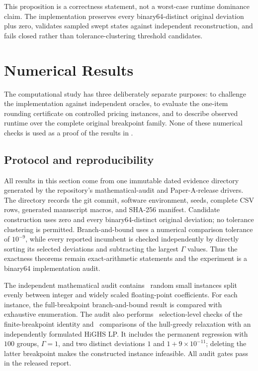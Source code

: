 \documentclass[11pt, a4paper]{article}
\theoremstyle{plain}
\theoremstyle{definition}
\theoremstyle{remark}
\begin{document}
This proposition is a correctness statement, not a worst-case runtime
dominance claim.  The implementation preserves every binary64-distinct
original deviation plus zero, validates sampled swept states against
independent reconstruction, and fails closed rather than tolerance-clustering
threshold candidates.


\section{Numerical Results}\label{sec:numerics}

The computational study has three deliberately separate purposes: to challenge
the implementation against independent oracles, to evaluate the one-item
rounding certificate on controlled pricing instances, and to describe observed
runtime over the complete original breakpoint family.  None of these numerical
checks is used as a proof of the results in
.

\subsection{Protocol and reproducibility}

All results in this section come from one immutable dated evidence directory
generated by the repository's mathematical-audit and Paper-A-release drivers.
The directory records the git
commit, software environment, seeds, complete CSV rows, generated manuscript
macros, and SHA-256 manifest.  Candidate construction uses zero and every
binary64-distinct original deviation; no tolerance clustering is permitted.
Branch-and-bound uses a numerical comparison tolerance of $10^{-9}$, while
every reported incumbent is checked independently by directly sorting its
selected deviations and subtracting the largest $\Gamma$ values.  Thus the
exactness theorems remain exact-arithmetic statements and the experiment is a
binary64 implementation audit.

The independent mathematical audit contains \AuditGlobalOracleCases\ random
small instances split evenly between integer and widely scaled floating-point
coefficients.  For each instance, the full-breakpoint branch-and-bound result
is compared with exhaustive enumeration.  The audit also performs
\AuditBreakpointChecks\ selection-level checks of the finite-breakpoint
identity and \AuditLPChecks\ comparisons of the hull-greedy relaxation with an
independently formulated HiGHS LP.  It includes the permanent regression with
$100$ groups, $\Gamma=1$, and two distinct deviations $1$ and
$1+9\times10^{-11}$; deleting the latter breakpoint makes the constructed
instance infeasible.  All audit gates pass in the released report.
\end{document}
